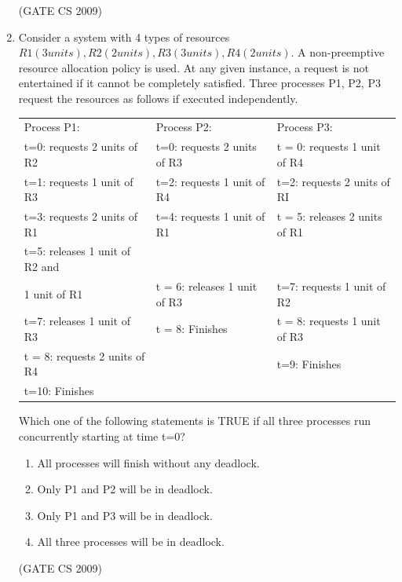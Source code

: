 \documentclass[a4paper, 11pt]{article}
\begin{document}
\begin{enumerate}
    \hfill (GATE CS 2009)

    \item Consider a system with 4 types of resources $R1 (3 units), R2 (2 units), R3 (3 units), R4 (2 units)$. A non-preemptive resource allocation policy is used. At any given instance, a request is not entertained if it cannot be completely satisfied. Three processes P1, P2, P3 request the resources as follows if executed independently.\\
    \begin{tabular}{|l|l|l|}
    \hline
        Process P1: & Process P2: & Process P3: \\
        t=0: requests 2 units of R2 & t=0: requests 2 units of R3 & t = 0: requests 1 unit of R4 \\
        t=1: requests 1 unit of R3 & t=2: requests 1 unit of R4 & t=2: requests 2 units of RI \\
        t=3: requests 2 units of R1 & t=4: requests 1 unit of R1 & t = 5: releases 2 units of R1 \\
        t=5: releases 1 unit of R2 and\\ 1 unit of R1 & t = 6: releases 1 unit of R3 & t=7: requests 1 unit of R2 \\
        t=7: releases 1 unit of R3 & t = 8: Finishes & t = 8: requests 1 unit of R3 \\
        t = 8: requests 2 units of R4 &  &  t=9: Finishes \\
        t=10: Finishes &  & \\
        \hline
    \end{tabular}

    Which one of the following statements is TRUE if all three processes run concurrently starting at time t=0?
    \begin{enumerate} 
        \item All processes will finish without any deadlock.
        \item Only P1 and P2 will be in deadlock.
        \item Only P1 and P3 will be in deadlock.
        \item All three processes will be in deadlock.
    \end{enumerate}

    \hfill (GATE CS 2009)


\end{enumerate}
\end{document}
